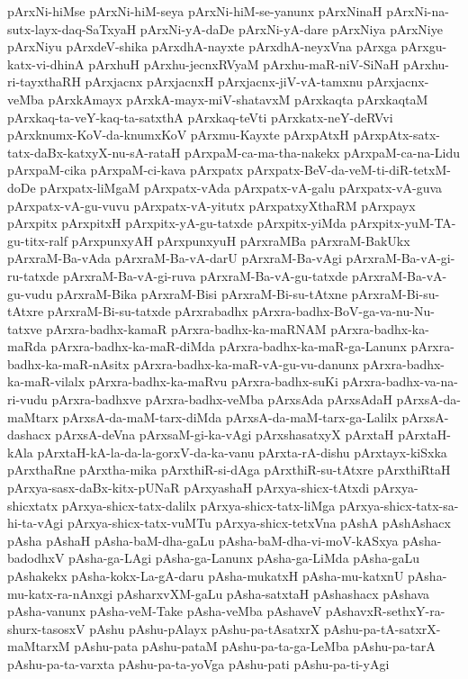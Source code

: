 {pArxNi-hiMse
pArxNi-hiM-seya
pArxNi-hiM-se-yanunx
pArxNinaH
pArxNi-na-sutx-layx-daq-SaTxyaH
pArxNi-yA-daDe
pArxNi-yA-dare
pArxNiya
pArxNiye
pArxNiyu
pArxdeV-shika
pArxdhA-nayxte
pArxdhA-neyxVna
pArxga
pArxgu-katx-vi-dhinA
pArxhuH
pArxhu-jecnxRVyaM
pArxhu-maR-niV-SiNaH
pArxhu-ri-tayxthaRH
pArxjacnx
pArxjacnxH
pArxjacnx-jiV-vA-tamxnu
pArxjacnx-veMba
pArxkAmayx
pArxkA-mayx-miV-shatavxM
pArxkaqta
pArxkaqtaM
pArxkaq-ta-veY-kaq-ta-satxthA
pArxkaq-teVti
pArxkatx-neY-deRVvi
pArxknumx-KoV-da-knumxKoV
pArxmu-Kayxte
pArxpAtxH
pArxpAtx-satx-tatx-daBx-katxyX-nu-sA-rataH
pArxpaM-ca-ma-tha-nakekx
pArxpaM-ca-na-Lidu
pArxpaM-cika
pArxpaM-ci-kava
pArxpatx
pArxpatx-BeV-da-veM-ti-diR-tetxM-doDe
pArxpatx-liMgaM
pArxpatx-vAda
pArxpatx-vA-galu
pArxpatx-vA-guva
pArxpatx-vA-gu-vuvu
pArxpatx-vA-yitutx
pArxpatxyXthaRM
pArxpayx
pArxpitx
pArxpitxH
pArxpitx-yA-gu-tatxde
pArxpitx-yiMda
pArxpitx-yuM-TA-gu-titx-ralf
pArxpunxyAH
pArxpunxyuH
pArxraMBa
pArxraM-BakUkx
pArxraM-Ba-vAda
pArxraM-Ba-vA-darU
pArxraM-Ba-vAgi
pArxraM-Ba-vA-gi-ru-tatxde
pArxraM-Ba-vA-gi-ruva
pArxraM-Ba-vA-gu-tatxde
pArxraM-Ba-vA-gu-vudu
pArxraM-Bika
pArxraM-Bisi
pArxraM-Bi-su-tAtxne
pArxraM-Bi-su-tAtxre
pArxraM-Bi-su-tatxde
pArxrabadhx
pArxra-badhx-BoV-ga-va-nu-Nu-tatxve
pArxra-badhx-kamaR
pArxra-badhx-ka-maRNAM
pArxra-badhx-ka-maRda
pArxra-badhx-ka-maR-diMda
pArxra-badhx-ka-maR-ga-Lanunx
pArxra-badhx-ka-maR-nAsitx
pArxra-badhx-ka-maR-vA-gu-vu-danunx
pArxra-badhx-ka-maR-vilalx
pArxra-badhx-ka-maRvu
pArxra-badhx-suKi
pArxra-badhx-va-na-ri-vudu
pArxra-badhxve
pArxra-badhx-veMba
pArxsAda
pArxsAdaH
pArxsA-da-maMtarx
pArxsA-da-maM-tarx-diMda
pArxsA-da-maM-tarx-ga-Lalilx
pArxsA-dashacx
pArxsA-deVna
pArxsaM-gi-ka-vAgi
pArxshasatxyX
pArxtaH
pArxtaH-kAla
pArxtaH-kA-la-da-la-gorxV-da-ka-vanu
pArxta-rA-dishu
pArxtayx-kiSxka
pArxthaRne
pArxtha-mika
pArxthiR-si-dAga
pArxthiR-su-tAtxre
pArxthiRtaH
pArxya-sasx-daBx-kitx-pUNaR
pArxyashaH
pArxya-shicx-tAtxdi
pArxya-shicxtatx
pArxya-shicx-tatx-dalilx
pArxya-shicx-tatx-liMga
pArxya-shicx-tatx-sa-hi-ta-vAgi
pArxya-shicx-tatx-vuMTu
pArxya-shicx-tetxVna
pAshA
pAshAshacx
pAsha
pAshaH
pAsha-baM-dha-gaLu
pAsha-baM-dha-vi-moV-kASxya
pAsha-badodhxV
pAsha-ga-LAgi
pAsha-ga-Lanunx
pAsha-ga-LiMda
pAsha-gaLu
pAshakekx
pAsha-kokx-La-gA-daru
pAsha-mukatxH
pAsha-mu-katxnU
pAsha-mu-katx-ra-nAnxgi
pAsharxvXM-gaLu
pAsha-satxtaH
pAshashacx
pAshava
pAsha-vanunx
pAsha-veM-Take
pAsha-veMba
pAshaveV
pAshavxR-sethxY-ra-shurx-tasosxV
pAshu
pAshu-pAlayx
pAshu-pa-tAsatxrX
pAshu-pa-tA-satxrX-maMtarxM
pAshu-pata
pAshu-pataM
pAshu-pa-ta-ga-LeMba
pAshu-pa-tarA
pAshu-pa-ta-varxta
pAshu-pa-ta-yoVga
pAshu-pati
pAshu-pa-ti-yAgi
}

